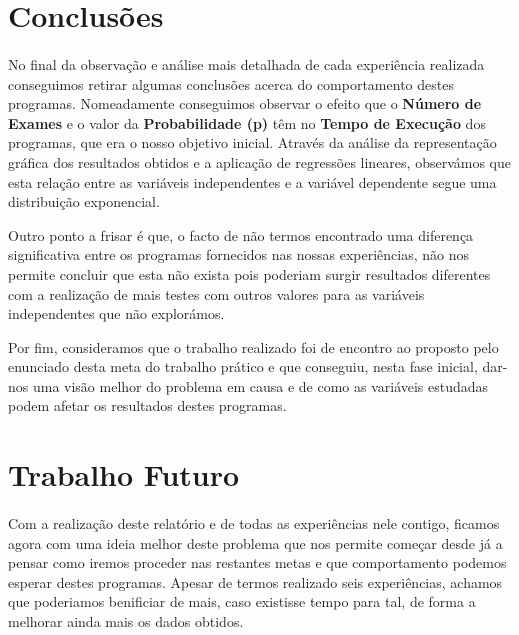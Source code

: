 \documentclass{article}
\begin{document}
\section{Conclusões}
\paragraph{}
No final da observação e análise mais detalhada de cada experiência realizada conseguimos retirar algumas conclusões acerca do comportamento destes programas. Nomeadamente conseguimos observar o efeito que o  \textbf{Número de Exames} e o valor da  \textbf{Probabilidade  (p)} têm no \textbf{Tempo de Execução} dos programas, que era o nosso objetivo inicial. Através da análise da representação gráfica dos resultados obtidos e a aplicação de regressões lineares, observámos que esta relação entre as variáveis independentes e a variável dependente segue uma distribuição exponencial.\par
Outro ponto a frisar é que, o facto de não termos encontrado uma diferença significativa entre os programas fornecidos nas nossas experiências, não nos permite concluir que esta não exista pois poderiam surgir resultados diferentes com a realização de mais testes com outros valores para as variáveis independentes que não explorámos.\par
Por fim, consideramos que o trabalho realizado foi de encontro ao proposto pelo enunciado desta meta do trabalho prático e que conseguiu, nesta fase inicial, dar-nos uma visão melhor do problema em causa e de como as variáveis estudadas podem afetar os resultados destes programas.

\section{Trabalho Futuro}
\paragraph{}
Com a realização deste relatório e de todas as experiências nele contigo, ficamos agora com uma ideia melhor deste problema que nos permite começar desde já a pensar como iremos proceder nas restantes metas e que comportamento podemos esperar destes programas. Apesar de termos realizado seis experiências, achamos que poderiamos benificiar de mais, caso existisse tempo para tal, de forma a melhorar ainda mais os dados obtidos.
\end{document}
